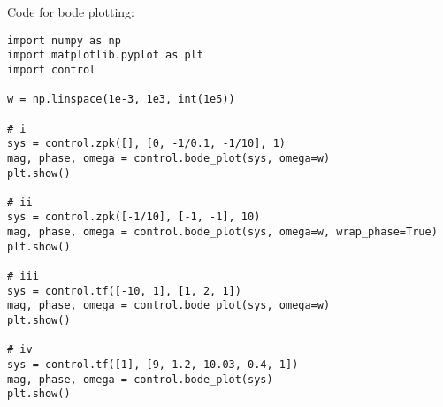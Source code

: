 Code for bode plotting:

\begin{verbatim}
import numpy as np
import matplotlib.pyplot as plt
import control

w = np.linspace(1e-3, 1e3, int(1e5))

# i
sys = control.zpk([], [0, -1/0.1, -1/10], 1)
mag, phase, omega = control.bode_plot(sys, omega=w)
plt.show()

# ii
sys = control.zpk([-1/10], [-1, -1], 10)
mag, phase, omega = control.bode_plot(sys, omega=w, wrap_phase=True)
plt.show()

# iii
sys = control.tf([-10, 1], [1, 2, 1])
mag, phase, omega = control.bode_plot(sys, omega=w)
plt.show()

# iv
sys = control.tf([1], [9, 1.2, 10.03, 0.4, 1])
mag, phase, omega = control.bode_plot(sys)
plt.show()
\end{verbatim}